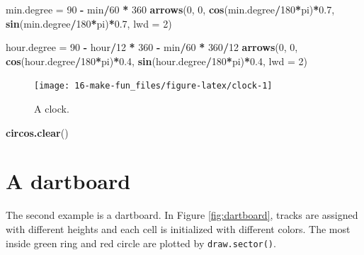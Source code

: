 \documentclass[]{book}
\newenvironment{Shaded}{\begin{snugshade}}{\end{snugshade}}
\newcommand{\KeywordTok}[1]{\textcolor[rgb]{0.13,0.29,0.53}{\textbf{#1}}}
\newcommand{\DataTypeTok}[1]{\textcolor[rgb]{0.13,0.29,0.53}{#1}}
\newcommand{\DecValTok}[1]{\textcolor[rgb]{0.00,0.00,0.81}{#1}}
\newcommand{\FloatTok}[1]{\textcolor[rgb]{0.00,0.00,0.81}{#1}}
\newcommand{\StringTok}[1]{\textcolor[rgb]{0.31,0.60,0.02}{#1}}
\newcommand{\OperatorTok}[1]{\textcolor[rgb]{0.81,0.36,0.00}{\textbf{#1}}}
\newcommand{\NormalTok}[1]{#1}
\theoremstyle{definition}
\theoremstyle{definition}
\theoremstyle{remark}
\begin{document}
\begin{Shaded}
\begin{Highlighting}[]
\NormalTok{min.degree =}\StringTok{ }\DecValTok{90} \OperatorTok{-}\StringTok{ }\NormalTok{min}\OperatorTok{/}\DecValTok{60} \OperatorTok{*}\StringTok{ }\DecValTok{360}
\KeywordTok{arrows}\NormalTok{(}\DecValTok{0}\NormalTok{, }\DecValTok{0}\NormalTok{, }\KeywordTok{cos}\NormalTok{(min.degree}\OperatorTok{/}\DecValTok{180}\OperatorTok{*}\NormalTok{pi)}\OperatorTok{*}\FloatTok{0.7}\NormalTok{, }\KeywordTok{sin}\NormalTok{(min.degree}\OperatorTok{/}\DecValTok{180}\OperatorTok{*}\NormalTok{pi)}\OperatorTok{*}\FloatTok{0.7}\NormalTok{, }\DataTypeTok{lwd =} \DecValTok{2}\NormalTok{)   }

\NormalTok{hour.degree =}\StringTok{ }\DecValTok{90} \OperatorTok{-}\StringTok{ }\NormalTok{hour}\OperatorTok{/}\DecValTok{12} \OperatorTok{*}\StringTok{ }\DecValTok{360} \OperatorTok{-}\StringTok{ }\NormalTok{min}\OperatorTok{/}\DecValTok{60} \OperatorTok{*}\StringTok{ }\DecValTok{360}\OperatorTok{/}\DecValTok{12}
\KeywordTok{arrows}\NormalTok{(}\DecValTok{0}\NormalTok{, }\DecValTok{0}\NormalTok{, }\KeywordTok{cos}\NormalTok{(hour.degree}\OperatorTok{/}\DecValTok{180}\OperatorTok{*}\NormalTok{pi)}\OperatorTok{*}\FloatTok{0.4}\NormalTok{, }\KeywordTok{sin}\NormalTok{(hour.degree}\OperatorTok{/}\DecValTok{180}\OperatorTok{*}\NormalTok{pi)}\OperatorTok{*}\FloatTok{0.4}\NormalTok{, }\DataTypeTok{lwd =} \DecValTok{2}\NormalTok{)}
\end{Highlighting}
\end{Shaded}

\begin{figure}

{\centering \texttt{[image: 16-make-fun\_files/figure-latex/clock-1]} 

}

\caption{A clock.}\label{fig:clock}
\end{figure}

\begin{Shaded}
\begin{Highlighting}[]
\KeywordTok{circos.clear}\NormalTok{()}
\end{Highlighting}
\end{Shaded}

\section{A dartboard}\label{a-dartboard}

The second example is a dartboard. In Figure \ref{fig:dartboard}, tracks
are assigned with different heights and each cell is initialized with
different colors. The most inside green ring and red circle are plotted
by \texttt{draw.sector()}.
\end{document}
